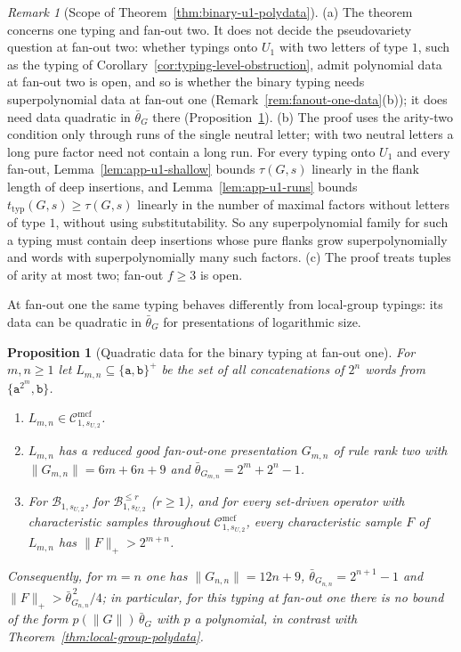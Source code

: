 \documentclass[11pt]{article}
\numberwithin{equation}{section}
\theoremstyle{plain}
\newtheorem{proposition}[theorem]{Proposition}
\theoremstyle{definition}
\theoremstyle{remark}
\newtheorem{remark}[theorem]{Remark}
\newcommand{\Cmcf}[2]{\mathcal{C}^{\mathrm{mcf}}_{#1,#2}}
\begin{document}
\begin{remark}[Scope of Theorem~\ref{thm:binary-u1-polydata}]
\label{rem:binary-u1-scope}
(a) The theorem concerns one typing and fan-out two.  It does not decide the
pseudovariety question at fan-out two: whether typings onto $U_1$ with two
letters of type $1$, such as the typing of
Corollary~\ref{cor:typing-level-obstruction}, admit polynomial data at fan-out
two is open, and so is whether the binary typing needs superpolynomial data at
fan-out one (Remark~\ref{rem:fanout-one-data}(b)); it does need data quadratic in
$\bar\theta_G$ there (Proposition~\ref{prop:binary-u1-quadratic}).
(b) The proof uses the arity-two condition only through runs of the single
neutral letter; with two neutral letters a long pure factor need not contain a
long run.  For every typing onto $U_1$ and every fan-out,
Lemma~\ref{lem:app-u1-shallow} bounds $\tau(G,s)$ linearly in the flank length
of deep insertions, and Lemma~\ref{lem:app-u1-runs} bounds
$t_{\mathrm{typ}}(G,s)\ge\tau(G,s)$ linearly in the number of maximal
factors without letters of type $1$, without using substitutability.  So any
superpolynomial family for such a typing must contain deep insertions whose
pure flanks grow superpolynomially and words with superpolynomially many such
factors.
(c) The proof treats tuples of arity at most two; fan-out $f\ge3$ is open.
\end{remark}

At fan-out one the same typing behaves differently from local-group typings:
its data can be quadratic in $\bar\theta_G$ for presentations of logarithmic size.

\begin{proposition}[Quadratic data for the binary typing at fan-out one]
\label{prop:binary-u1-quadratic}
For $m,n\ge1$ let $L_{m,n}\subseteq\{\mathtt a,\mathtt b\}^+$ be the set of all
concatenations of $2^n$ words from $\{\mathtt a^{2^m},\mathtt b\}$.
\begin{enumerate}[label=\textup{(\roman*)},leftmargin=*]
\item $L_{m,n}\in\Cmcf{1}{s_{U,2}}$.
\item $L_{m,n}$ has a reduced good fan-out-one presentation $G_{m,n}$ of rule rank
two with $\|G_{m,n}\|=6m+6n+9$ and $\bar\theta_{G_{m,n}}=2^m+2^n-1$.
\item For $\mathcal B_{1,s_{U,2}}$, for $\mathcal B^{\le r}_{1,s_{U,2}}$ \textup($r\ge1$\textup),
and for every set-driven operator with characteristic samples throughout
$\Cmcf{1}{s_{U,2}}$, every characteristic sample $F$ of $L_{m,n}$ has
$\|F\|_+>2^{m+n}$.
\end{enumerate}
Consequently, for $m=n$ one has $\|G_{n,n}\|=12n+9$, $\bar\theta_{G_{n,n}}=2^{n+1}-1$
and $\|F\|_+>\bar\theta_{G_{n,n}}^{\,2}/4$; in particular, for this typing at
fan-out one there is no bound of the form $p(\|G\|)\,\bar\theta_G$ with $p$ a
polynomial, in contrast with Theorem~\ref{thm:local-group-polydata}.
\end{proposition}
\end{document}
